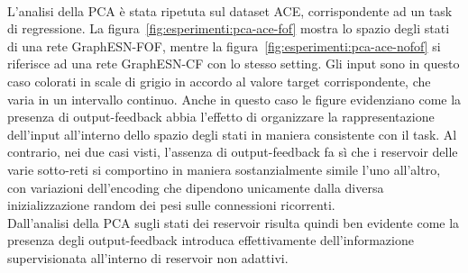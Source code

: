%
\\
L'analisi della PCA è stata ripetuta sul dataset ACE, corrispondente ad un task di regressione. La figura~\vref{fig:esperimenti:pca-ace-fof} mostra lo spazio degli stati di una rete GraphESN-FOF, mentre la figura~\ref{fig:esperimenti:pca-ace-nofof} si riferisce ad una rete GraphESN-CF con lo stesso setting. Gli input sono in questo caso colorati in scale di grigio in accordo al valore target corrispondente, che varia in un intervallo continuo.
Anche in questo caso le figure evidenziano come la presenza di output-feedback abbia l'effetto di organizzare la rappresentazione dell'input all'interno dello spazio degli stati in maniera consistente con il task. Al contrario, nei due casi visti, l'assenza di output-feedback fa sì che i reservoir delle varie sotto-reti si comportino in maniera sostanzialmente simile l'uno all'altro, con variazioni dell'encoding che dipendono unicamente dalla diversa inizializzazione random dei pesi sulle connessioni ricorrenti.\\
Dall'analisi della PCA sugli stati dei reservoir risulta quindi ben evidente come la presenza degli output-feedback introduca effettivamente dell'informazione supervisionata all'interno di reservoir non adattivi.
%
